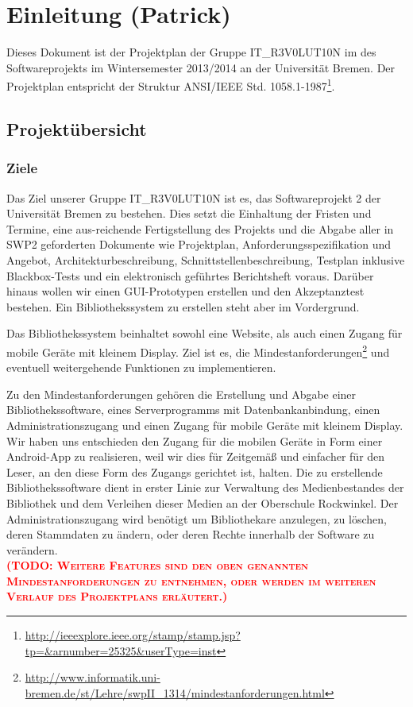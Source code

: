 \documentclass[fontsize=12pt,paper=a4,twoside]{scrartcl}
\newcommand{\todo}[1]{\textbf{\textsc{\textcolor{red}{(TODO: #1)}}}}
\begin{document}
\section{Einleitung (Patrick)}

Dieses Dokument ist der Projektplan der Gruppe IT\_R3V0LUT10N im des Softwareprojekts im Wintersemester 2013/2014 an der Universität Bremen. Der Projektplan entspricht der Struktur ANSI/IEEE Std. 1058.1-1987\footnote{\url{http://ieeexplore.ieee.org/stamp/stamp.jsp?tp=&arnumber=25325&userType=inst}}.

\subsection{Projektübersicht}


\subsubsection{Ziele}

Das Ziel unserer Gruppe IT\_R3V0LUT10N ist es, das Softwareprojekt 2 der Universität Bremen zu bestehen. Dies setzt die Einhaltung der Fristen und Termine, eine aus-reichende Fertigstellung des Projekts und die Abgabe aller in SWP2 geforderten Dokumente wie Projektplan, Anforderungsspezifikation und Angebot, Architekturbeschreibung, Schnittstellenbeschreibung, Testplan inklusive Blackbox-Tests und ein elektronisch geführtes Berichtsheft voraus. Darüber hinaus wollen wir einen GUI-Prototypen erstellen und den Akzeptanztest bestehen. Ein Bibliothekssystem zu erstellen steht aber im Vordergrund.

Das Bibliothekssystem beinhaltet sowohl eine Website, als auch einen Zugang für mobile Geräte mit kleinem Display. Ziel ist es, die Mindestanforderungen\footnote{\label{minreq}\url{http://www.informatik.uni-bremen.de/st/Lehre/swpII_1314/mindestanforderungen.html}} und eventuell weitergehende Funktionen zu implementieren.

Zu den Mindestanforderungen gehören die Erstellung und Abgabe einer Bibliothekssoftware, eines Serverprogramms mit Datenbankanbindung, einen Administrationszugang und einen Zugang für mobile Geräte mit kleinem Display. Wir haben uns entschieden den Zugang für die mobilen Geräte in Form einer Android-App zu realisieren, weil wir dies für Zeitgemäß und einfacher für den Leser, an den diese Form des Zugangs gerichtet ist, halten. Die zu erstellende Bibliothekssoftware dient in erster Linie zur Verwaltung des Medienbestandes der Bibliothek und dem Verleihen dieser Medien an der Oberschule Rockwinkel. Der Administrationszugang wird benötigt um Bibliothekare anzulegen, zu löschen, deren Stammdaten zu ändern, oder deren Rechte innerhalb der Software zu verändern.\\ \todo{Weitere Features sind den oben genannten Mindestanforderungen zu entnehmen, oder werden im weiteren Verlauf des Projektplans erläutert.}
\end{document}
